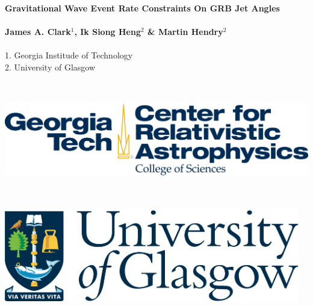 \documentclass[a0,landscape]{a0poster}
\begin{document}

\begin{minipage}[b]{0.70\linewidth}
\veryHuge \color{NavyBlue} \textbf{Gravitational Wave Event Rate Constraints On
GRB Jet Angles} \color{Black}\\ \\%
\huge \textbf{James A. Clark$^{1}$, Ik Siong Heng$^{2}$ \& Martin
Hendry$^{2}$}\\ \\%
\large 1. Georgia Institude of Technology\\ %
\large 2. University of Glasgow\\ %
\end{minipage}
%
\hspace{10cm}
%
\begin{minipage}[b]{0.2\linewidth}
\vspace{-5cm}
\includegraphics[height=5cm]{cra.png} \\ \\%
\includegraphics[height=4cm]{uni_glasgow_logo.png} \\ \\%
\end{minipage}
\end{document}
